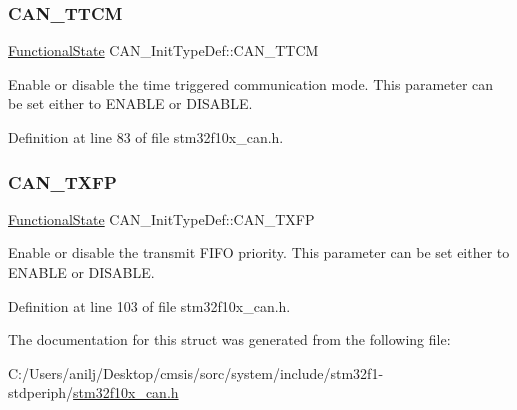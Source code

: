 \subsubsection{\texorpdfstring{C\+A\+N\+\_\+\+T\+T\+CM}{CAN\_TTCM}}
{\footnotesize\ttfamily \hyperlink{group___exported__types_gac9a7e9a35d2513ec15c3b537aaa4fba1}{Functional\+State} C\+A\+N\+\_\+\+Init\+Type\+Def\+::\+C\+A\+N\+\_\+\+T\+T\+CM}

Enable or disable the time triggered communication mode. This parameter can be set either to E\+N\+A\+B\+LE or D\+I\+S\+A\+B\+LE. 

Definition at line 83 of file stm32f10x\+\_\+can.\+h.

\mbox{\label{struct_c_a_n___init_type_def_a003de4b70fc93b4f820f320c6ea75a16}} 
\subsubsection{\texorpdfstring{C\+A\+N\+\_\+\+T\+X\+FP}{CAN\_TXFP}}
{\footnotesize\ttfamily \hyperlink{group___exported__types_gac9a7e9a35d2513ec15c3b537aaa4fba1}{Functional\+State} C\+A\+N\+\_\+\+Init\+Type\+Def\+::\+C\+A\+N\+\_\+\+T\+X\+FP}

Enable or disable the transmit F\+I\+FO priority. This parameter can be set either to E\+N\+A\+B\+LE or D\+I\+S\+A\+B\+LE. 

Definition at line 103 of file stm32f10x\+\_\+can.\+h.



The documentation for this struct was generated from the following file\+:\begin{DoxyCompactItemize}
\item 
C\+:/\+Users/anilj/\+Desktop/cmsis/sorc/system/include/stm32f1-\/stdperiph/\hyperlink{stm32f10x__can_8h}{stm32f10x\+\_\+can.\+h}\end{DoxyCompactItemize}
